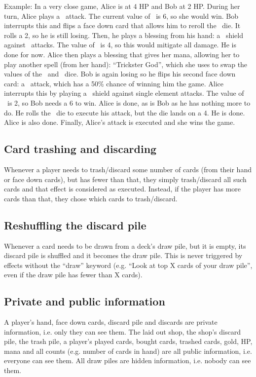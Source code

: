 \documentclass[dvipsnames,parskip,a4paper]{scrartcl}
\begin{document}
Example: In a very close game, Alice is at 4 HP and Bob at 2 HP. During her turn, Alice plays a \fire \ attack. The current value of \fire \ is 6, so she would win. Bob interrupts this and flips a face down card that allows him to reroll the \fire \ die. It rolls a 2, so he is still losing. Then, he plays a blessing from his hand: a \water \ shield against \fire \ attacks. The value of \water \ is 4, so this would mitigate all damage. He is done for now. Alice then plays a blessing that gives her mana, allowing her to play another spell (from her hand): ``Trickster God'', which she uses to swap the values of the \fire \ and \water \ dice. Bob is again losing so he flips his second face down card: a \chance \ attack, which has a 50\% chance of winning him the game. Alice interrupts this by playing a \gold \ shield against single element attacks. The value of \gold \ is 2, so Bob needs a 6 to win. Alice is done, as is Bob as he has nothing more to do. He rolls the \chace \ die to execute his attack, but the die lands on a 4. He is done. Alice is also done. Finally, Alice's attack is executed and she wins the game.

\subsection*{Card trashing and discarding}

Whenever a player needs to trash/discard some number of cards (from their hand or face down cards), but has fewer than that, they simply trash/discard all such cards and that effect is considered as executed. Instead, if the player has more cards than that, they chose which cards to trash/discard.

\subsection*{Reshuffling the discard pile}

Whenever a card needs to be drawn from a deck's draw pile, but it is empty, its discard pile is shuffled and it becomes the draw pile. This is never triggered by effects without the ``draw'' keyword (e.g. ``Look at top X cards of your draw pile'', even if the draw pile has fewer than X cards).

\subsection*{Private and public information}

A player's hand, face down cards, discard pile and discards are private information, i.e. only they can see them. The laid out shop, the shop's discard pile, the trash pile, a player's played cards, bought cards, trashed cards, gold, HP, mana and all counts (e.g. number of cards in hand) are all public information, i.e. everyone can see them. All draw piles are hidden information, i.e. nobody can see them.
\end{document}
